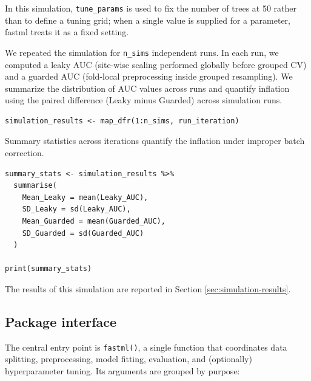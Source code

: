In this simulation, \texttt{tune\_params} is used to fix the number of trees at 50 rather than to define a tuning grid; when a single value is supplied for a parameter, fastml treats it as a fixed setting.

We repeated the simulation for \texttt{n\_sims} independent runs. In each run, we computed a leaky AUC (site-wise scaling performed globally before grouped CV) and a guarded AUC (fold-local preprocessing inside grouped resampling). We summarize the distribution of AUC values across runs and quantify inflation using the paired difference (Leaky minus Guarded) across simulation runs.

\begin{verbatim}
simulation_results <- map_dfr(1:n_sims, run_iteration)
\end{verbatim}

Summary statistics across iterations quantify the inflation under improper batch correction.

\begin{verbatim}
summary_stats <- simulation_results %>%
  summarise(
    Mean_Leaky = mean(Leaky_AUC),
    SD_Leaky = sd(Leaky_AUC),
    Mean_Guarded = mean(Guarded_AUC),
    SD_Guarded = sd(Guarded_AUC)
  )

print(summary_stats)
\end{verbatim}

The results of this simulation are reported in Section \ref{sec:simulation-results}.

\subsection{Package interface}\label{sec:package-interface}

The central entry point is \texttt{fastml()}, a single function that coordinates data splitting, preprocessing, model fitting, evaluation, and (optionally) hyperparameter tuning. Its arguments are grouped by purpose:


